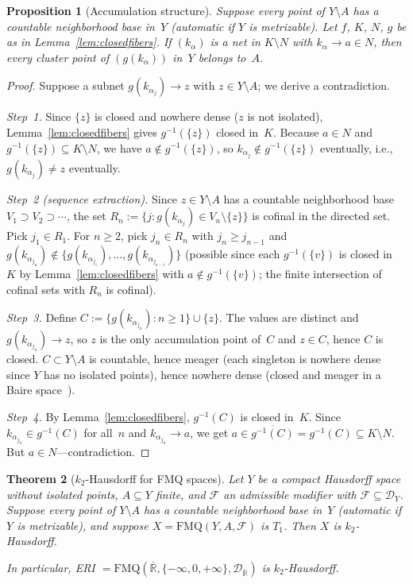 \documentclass[11pt]{article}
\newtheorem{theorem}{Theorem}[section]
\newtheorem{proposition}[theorem]{Proposition}
\theoremstyle{definition}
\theoremstyle{remark}
\begin{document}
\begin{proposition}[Accumulation structure]\label{prop:accum}
Suppose every point of $Y \setminus A$ has a countable neighborhood base
in~$Y$ \textup{(}automatic if $Y$ is metrizable\textup{)}.
Let $f$, $K$, $N$, $g$ be as in Lemma~\textup{\ref{lem:closedfibers}}.
If $(k_\alpha)$ is a net in $K \setminus N$ with $k_\alpha \to a \in N$,
then every cluster point of $(g(k_\alpha))$ in~$Y$ belongs to~$A$.
\end{proposition}

\begin{proof}
Suppose a subnet $g(k_{\alpha_j}) \to z$ with $z \in Y \setminus A$;
we derive a contradiction.

\emph{Step~1.}
Since $\{z\}$ is closed and nowhere dense ($z$ is not isolated),
Lemma~\ref{lem:closedfibers} gives $g^{-1}(\{z\})$ closed in~$K$.
Because $a \in N$ and $g^{-1}(\{z\}) \subseteq K \setminus N$, we have
$a \notin g^{-1}(\{z\})$, so $k_{\alpha_j} \notin g^{-1}(\{z\})$
eventually, i.e., $g(k_{\alpha_j}) \neq z$ eventually.

\emph{Step~2 (sequence extraction).}
Since $z \in Y \setminus A$ has a countable neighborhood base
$V_1 \supset V_2 \supset \cdots$, the set
$R_n := \{j : g(k_{\alpha_j}) \in V_n \setminus \{z\}\}$ is cofinal
in the directed set.
Pick $j_1 \in R_1$. For $n \ge 2$, pick $j_n \in R_n$ with
$j_n \ge j_{n-1}$ and
$g(k_{\alpha_{j_n}}) \notin
\{g(k_{\alpha_{j_1}}), \ldots, g(k_{\alpha_{j_{n-1}}})\}$
(possible since each $g^{-1}(\{v\})$ is closed in~$K$ by
Lemma~\ref{lem:closedfibers} with $a \notin g^{-1}(\{v\})$;
the finite intersection of cofinal sets with $R_n$ is cofinal).

\emph{Step~3.}
Define $C := \{g(k_{\alpha_{j_n}}) : n \ge 1\} \cup \{z\}$.
The values are distinct and $g(k_{\alpha_{j_n}}) \to z$, so $z$ is the
only accumulation point of~$C$ and $z \in C$, hence $C$ is closed.
$C \subset Y \setminus A$ is countable, hence meager (each singleton is
nowhere dense since $Y$ has no isolated points), hence nowhere dense
(closed and meager in a Baire
space~\cite[Theorem~3.9.3]{bib:engelking}).

\emph{Step~4.}
By Lemma~\ref{lem:closedfibers}, $g^{-1}(C)$ is closed in~$K$.
Since $k_{\alpha_{j_n}} \in g^{-1}(C)$ for all~$n$ and
$k_{\alpha_{j_n}} \to a$, we get
$a \in \overline{g^{-1}(C)} = g^{-1}(C) \subseteq K \setminus N$.
But $a \in N$---contradiction.
\end{proof}

\begin{theorem}[$k_2$-Hausdorff for FMQ spaces]\label{thm:k2H}
Let $Y$ be a compact Hausdorff space without isolated points,
$A \subseteq Y$ finite, and $\mathcal{F}$ an admissible modifier with
$\mathcal{F} \subseteq \mathcal{D}_Y$.
Suppose every point of $Y \setminus A$ has a countable neighborhood base
in~$Y$ \textup{(}automatic if $Y$ is metrizable\textup{)}, and suppose
$X = \mathrm{FMQ}(Y, A, \mathcal{F})$ is $T_1$. Then $X$ is
$k_2$-Hausdorff.

In particular, ERI $= \mathrm{FMQ}(\overline{\mathbb{R}},
\{-\infty,0,+\infty\}, \mathcal{D}_{\overline{\mathbb{R}}})$ is
$k_2$-Hausdorff.
\end{theorem}
\end{document}
